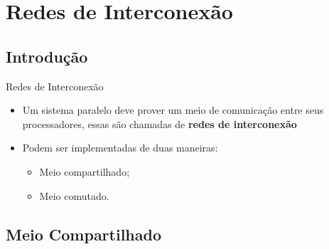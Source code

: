
\section{Redes de Interconexão}

\subsection{Introdução}

\begin{frame}{Redes de Interconexão}
    \begin{itemize}
        \item Um sistema paralelo deve prover um meio de comunicação entre seus processadores, essas são chamadas de \textbf{redes de interconexão}
        \bigskip
        \item Podem ser implementadas de duas maneiras:
        \medskip
        \begin{itemize}
            \item Meio compartilhado;
            \medskip
            \item Meio comutado.
        \end{itemize}
    \end{itemize}
\end{frame}

\subsection{Meio Compartilhado}

